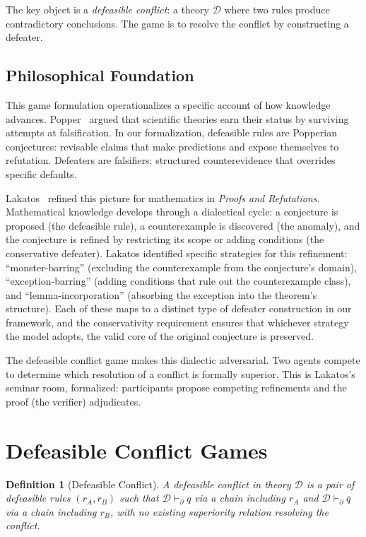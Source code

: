 \documentclass{article}
\newtheorem{definition}{Definition}
\newcommand{\D}{\mathcal{D}}
\newcommand{\pPartial}{\vdash_{\partial}}
\newcommand{\comp}[1]{\overline{#1}}
\begin{document}
The key object is a \emph{defeasible conflict}: a theory $\D$ where two rules produce contradictory conclusions. The game is to resolve the conflict by constructing a defeater.

\subsection*{Philosophical Foundation}

This game formulation operationalizes a specific account of how knowledge advances. Popper~\cite{popper1959logic} argued that scientific theories earn their status by surviving attempts at falsification. In our formalization, defeasible rules are Popperian conjectures: revisable claims that make predictions and expose themselves to refutation. Defeaters are falsifiers: structured counterevidence that overrides specific defaults.

Lakatos~\cite{lakatos1976proofs} refined this picture for mathematics in \emph{Proofs and Refutations}. Mathematical knowledge develops through a dialectical cycle: a conjecture is proposed (the defeasible rule), a counterexample is discovered (the anomaly), and the conjecture is refined by restricting its scope or adding conditions (the conservative defeater). Lakatos identified specific strategies for this refinement: ``monster-barring'' (excluding the counterexample from the conjecture's domain), ``exception-barring'' (adding conditions that rule out the counterexample class), and ``lemma-incorporation'' (absorbing the exception into the theorem's structure). Each of these maps to a distinct type of defeater construction in our framework, and the conservativity requirement ensures that whichever strategy the model adopts, the valid core of the original conjecture is preserved.

The defeasible conflict game makes this dialectic adversarial. Two agents compete to determine which resolution of a conflict is formally superior. This is Lakatos's seminar room, formalized: participants propose competing refinements and the proof (the verifier) adjudicates.

\section{Defeasible Conflict Games}

\begin{definition}[Defeasible Conflict]
A defeasible conflict in theory $\D$ is a pair of defeasible rules $(r_A, r_B)$ such that $\D \pPartial q$ via a chain including $r_A$ and $\D \pPartial \comp{q}$ via a chain including $r_B$, with no existing superiority relation resolving the conflict.
\end{definition}
\end{document}
